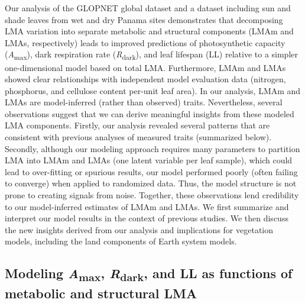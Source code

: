 \documentclass[
  12pt,
  letterpaper,
  DIV=11,
  numbers=noendperiod]{scrartcl}
\begin{document}
Our analysis of the GLOPNET global dataset and a dataset including sun
and shade leaves from wet and dry Panama sites demonstrates that
decomposing LMA variation into separate metabolic and structural
components (LMAm and LMAs, respectively) leads to improved predictions
of photosynthetic capacity (\emph{A}\textsubscript{max}), dark
respiration rate (\emph{R}\textsubscript{dark}), and leaf lifespan (LL)
relative to a simpler one-dimensional model based on total LMA.
Furthermore, LMAm and LMAs showed clear relationships with independent
model evaluation data (nitrogen, phosphorus, and cellulose content
per-unit leaf area). In our analysis, LMAm and LMAs are model-inferred
(rather than observed) traits. Nevertheless, several observations
suggest that we can derive meaningful insights from these modeled LMA
components. Firstly, our analysis revealed several patterns that are
consistent with previous analyses of measured traits (summarized below).
Secondly, although our modeling approach requires many parameters to
partition LMA into LMAm and LMAs (one latent variable per leaf sample),
which could lead to over-fitting or spurious results, our model
performed poorly (often failing to converge) when applied to randomized
data. Thus, the model structure is not prone to creating signals from
noise. Together, these observations lend credibility to our
model-inferred estimates of LMAm and LMAs. We first summarize and
interpret our model results in the context of previous studies. We then
discuss the new insights derived from our analysis and implications for
vegetation models, including the land components of Earth system models.

\subsection{\texorpdfstring{Modeling \emph{A}\textsubscript{max},
\emph{R}\textsubscript{dark}, and LL as functions of metabolic and
structural
LMA}{Modeling Amax, Rdark, and LL as functions of metabolic and structural LMA}}\label{modeling-amax-rdark-and-ll-as-functions-of-metabolic-and-structural-lma}
\end{document}
